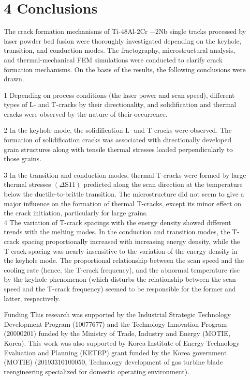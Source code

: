 \documentclass[10pt]{article}
\begin{document}
\section*{4 Conclusions}
The crack formation mechanisms of Ti-48Al-2Cr $-2 \mathrm{Nb}$ single tracks processed by laser powder bed fusion were thoroughly investigated depending on the keyhole, transition, and conduction modes. The fractography, microstructural analysis, and thermal-mechanical FEM simulations were conducted to clarify crack formation mechanisms. On the basis of the results, the following conclusions were drawn.

1 Depending on process conditions (the laser power and scan speed), different types of L- and T-cracks by their directionality, and solidification and thermal cracks were observed by the nature of their occurrence.

2 In the keyhole mode, the solidification L- and T-cracks were observed. The formation of solidification cracks was associated with directionally developed grain structures along with tensile thermal stresses loaded perpendicularly to those grains.

3 In the transition and conduction modes, thermal T-cracks were formed by large thermal stresses $(\Delta \mathrm{S} 11)$ predicted along the scan direction at the temperature below the ductile-to-brittle transition. The microstructure did not seem to give a major influence on the formation of thermal T-cracks, except its minor effect on the crack initiation, particularly for large grains.\\
4 The variation of T-crack spacings with the energy density showed different trends with the melting modes. In the conduction and transition modes, the T-crack spacing proportionally increased with increasing energy density, while the T-crack spacing was nearly insensitive to the variation of the energy density in the keyhole mode. The proportional relationship between the scan speed and the cooling rate (hence, the T-crack frequency), and the abnormal temperature rise by the keyhole phenomenon (which disturbs the relationship between the scan speed and the T-crack frequency) seemed to be responsible for the former and latter, respectively.

Funding This research was supported by the Industrial Strategic Technology Development Program (10077677) and the Technology Innovation Program (20000201) funded by the Ministry of Trade, Industry and Energy (MOTIE, Korea). This work was also supported by Korea Institute of Energy Technology Evaluation and Planning (KETEP) grant funded by the Korea government (MOTIE) (20193310100050, Technology development of gas turbine blade reengineering specialized for domestic operating environment).
\end{document}

